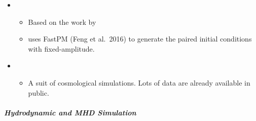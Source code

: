 \documentclass[letterpaper,10pt,english]{sphinxmanual}
\begin{document}
\begin{itemize}
\item {} 
\begin{itemize}
\item {} 
Based on the work by 

\item {} 
 uses FastPM (Feng et al. 2016) to generate the paired
initial conditions with fixed-amplitude.

\end{itemize}

\item {} 
\begin{itemize}
\item {} 
A suit of cosmological simulations. Lots of data are already
available in public.

\end{itemize}

\end{itemize}


\subparagraph{Hydrodynamic and MHD Simulation}
\label{\detokenize{resource/astro/topics/simulations:hydrodynamic-and-mhd-simulation}}
\end{document}
